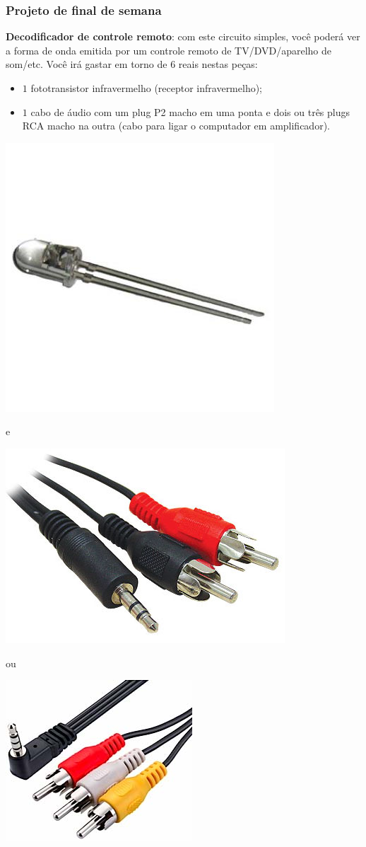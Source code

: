 \documentclass{beamer}
\begin{document}
\begin{frame}
\frametitle{Projeto de final de semana}

\textbf{Decodificador de controle remoto}: com este circuito simples,
você poderá ver a forma de onda emitida por um controle remoto de
TV/DVD/aparelho de som/etc. Você irá gastar em torno de $6$ reais nestas
peças:
\begin{itemize}
\item $1$ fototransistor infravermelho (receptor infravermelho);
\item $1$ cabo de áudio com um plug P2 macho em uma ponta e dois
ou três plugs RCA macho na outra (cabo para ligar o computador em amplificador).
\end{itemize}

\begin{minipage}{20ex}%
\includegraphics[width=20ex]{images/fototransistor}%
\end{minipage}%
\hfill e \hfill%
\begin{minipage}{18ex}%
\includegraphics[width=20ex]{images/cabop2rcap2}%
\end{minipage}%
\hfill ou \hfill%
\begin{minipage}{20ex}%
\includegraphics[width=20ex]{images/cabo_filmadora}%
\end{minipage}%

\end{frame}

\end{document}
